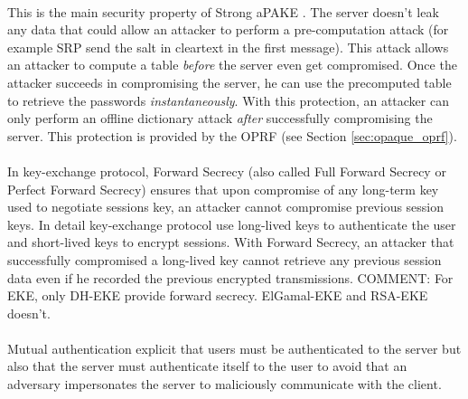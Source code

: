 ﻿\documentclass[../report.tex]{subfiles}
\begin{document}
\paragraph{} \label{sec:secure_against_pca}
This is the main security property of Strong aPAKE \cite{OPAQUE_Paper}. The server doesn't leak any data that could allow an attacker to perform a pre-computation attack (for example SRP send the salt in cleartext in the first message). This attack allows an attacker to compute a table \emph{before} the server even get compromised. Once the attacker succeeds in compromising the server, he can use the precomputed table to retrieve the passwords \emph{instantaneously}. With this protection, an attacker can only perform an offline dictionary attack \emph{after} successfully compromising the server.
This protection is provided by the OPRF (see Section \ref{sec:opaque_oprf}).

\paragraph{}
In key-exchange protocol, Forward Secrecy (also called Full Forward Secrecy or Perfect Forward Secrecy) ensures that upon compromise of any long-term key used to negotiate sessions key, an attacker cannot compromise previous session keys.
In detail key-exchange protocol use long-lived keys to authenticate the user and short-lived keys to encrypt sessions. With Forward Secrecy, an attacker that successfully compromised a long-lived key cannot retrieve any previous session data even if he recorded the previous encrypted transmissions. %
COMMENT: For EKE, only DH-EKE provide forward secrecy. ElGamal-EKE and RSA-EKE doesn't.
\paragraph{}
Mutual authentication explicit that users must be authenticated to the server but also that the server must authenticate itself to the user to avoid that an adversary impersonates the server to maliciously communicate with the client.
\end{document}
